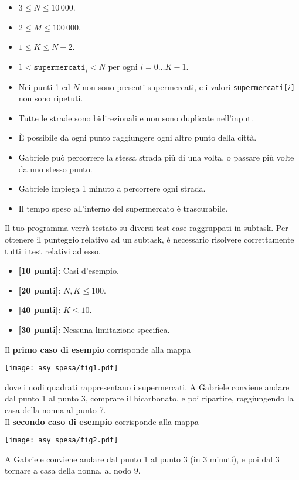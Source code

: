 \Constraints
\begin{itemize}[nolistsep, itemsep=2mm]
	\item $3 \le N \le 10\,000$.
	\item $2 \le M \le 100\,000$.
	\item $1 \le K \le N-2$.
	\item $1 < \texttt{supermercati}_i < N$ per ogni $i=0\ldots K-1$.
	\item Nei punti 1 ed $N$ non sono presenti supermercati, e i valori \texttt{supermercati[$i$]} non sono ripetuti.
	\item Tutte le strade sono bidirezionali e non sono duplicate nell'input.
	\item È possibile da ogni punto raggiungere ogni altro punto della città.
	\item Gabriele può percorrere la stessa strada più di una volta, o passare più volte da uno stesso punto.
	\item Gabriele impiega 1 minuto a percorrere ogni strada.
	\item Il tempo speso all'interno del supermercato è trascurabile.
\end{itemize}

\Scoring
Il tuo programma verrà testato su diversi test case raggruppati in subtask.
Per ottenere il punteggio relativo ad un subtask, è necessario risolvere
correttamente tutti i test relativi ad esso.

\begin{itemize}[nolistsep,itemsep=2mm]
  \item \textbf{ [10 punti]}: Casi d'esempio.
  \item \textbf{ [20 punti]}: $N, K \leq 100$.
  \item \textbf{ [40 punti]}: $K \le 10$.
  \item \textbf{ [30 punti]}: Nessuna limitazione specifica.
\end{itemize}

\Examples
\begin{example}
%
\end{example}
\begin{example}
%
\end{example}


\Explanation
Il \textbf{primo caso di esempio} corrisponde alla mappa
\begin{center}\texttt{[image: asy\_spesa/fig1.pdf]}\end{center}
dove i nodi quadrati rappresentano i supermercati. A Gabriele conviene andare dal punto 1 al punto 3, comprare il bicarbonato, e poi ripartire, raggiungendo la casa della nonna al punto 7.\\[2mm]
Il \textbf{secondo caso di esempio} corrisponde alla mappa
\begin{center}\texttt{[image: asy\_spesa/fig2.pdf]}\end{center}
A Gabriele conviene andare dal punto 1 al punto 3 (in 3 minuti), e poi dal 3 tornare a casa della nonna, al nodo 9. 
